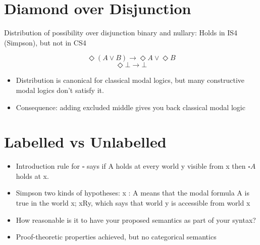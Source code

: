 \documentclass[11pt]{article}
\begin{document}
\section{Diamond over Disjunction}

Distribution of possibility over disjunction binary and nullary: Holds in IS4 (Simpson), but not in CS4

$$\Diamond(A \lor B) \rightarrow \Diamond A \lor \Diamond B$$
$$\Diamond\bot \rightarrow \bot$$

\begin{itemize}
    \item Distribution is canonical for classical modal logics, but many constructive modal logics don't satisfy it.
    \item Consequence: adding excluded middle gives you back classical modal logic
\end{itemize}

\section{Labelled vs Unlabelled}

\begin{itemize}
    \item Introduction rule for $\square$ says if A holds at every world y visible from x then $\square A$ holds at x.
    \item Simpson two kinds of hypotheses:  x : A means that the modal formula A is true in the world x; xRy, which says that world y is accessible from world x
    \item How reasonable is it to have your proposed semantics as part of your syntax?
    \item Proof-theoretic properties achieved, but no categorical semantics
\end{itemize}

\newpage
\printbibliography[heading=bibintoc]
\end{document}
